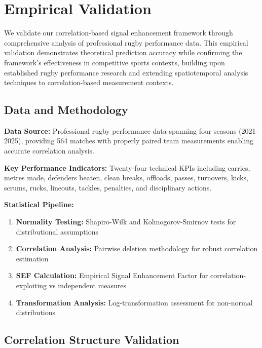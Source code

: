 \section{Empirical Validation}

We validate our correlation-based signal enhancement framework through comprehensive analysis of professional rugby performance data. This empirical validation demonstrates theoretical prediction accuracy while confirming the framework's effectiveness in competitive sports contexts, building upon established rugby performance research \cite{bennett2019descriptive, scott2023performance, bennett2021predicting, scott2023classifying} and extending spatiotemporal analysis techniques \cite{bornn2021spatiotemporal} to correlation-based measurement contexts.

\subsection{Data and Methodology}

\textbf{Data Source:} Professional rugby performance data spanning four seasons (2021-2025), providing 564 matches with properly paired team measurements enabling accurate correlation analysis.

\textbf{Key Performance Indicators:} Twenty-four technical KPIs including carries, metres made, defenders beaten, clean breaks, offloads, passes, turnovers, kicks, scrums, rucks, lineouts, tackles, penalties, and disciplinary actions.

\textbf{Statistical Pipeline:}
\begin{enumerate}
    \item \textbf{Normality Testing:} Shapiro-Wilk and Kolmogorov-Smirnov tests for distributional assumptions
    \item \textbf{Correlation Analysis:} Pairwise deletion methodology for robust correlation estimation  
    \item \textbf{SEF Calculation:} Empirical Signal Enhancement Factor for correlation-exploiting vs independent measures
    \item \textbf{Transformation Analysis:} Log-transformation assessment for non-normal distributions
\end{enumerate}

\subsection{Correlation Structure Validation}

